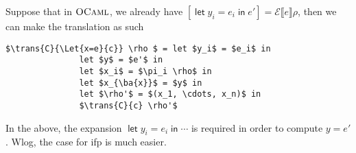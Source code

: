 \documentclass[11pt,a4paper]{article}
\newcommand {\coo} [1] {\ensuremath{\operatorname{\mathsf{#1}}}}
\newcommand{\Let}[1]{\coo{let} #1 \coo{in} }
\newcommand{\ba}[1]{\left\langle #1\right\rangle}
\newcommand{\f}[1]{\textsc{#1}}
\newcommand{\g}[1]{\textsf{#1}}
\newcommand{\trans}[2]{\ensuremath{\mathcal{#1}\llbracket #2\rrbracket}}
\begin{document}
Suppose that in $\f{OCaml}$, we already have $[\Let{y_i = e_i}{e'}] = \trans{E}{e}\rho$, then we can make the translation as such
\begin{lstlisting}
$\trans{C}{\Let{x=e}{c}} \rho $ = let $y_i$ = $e_i$ in
               let $y$ = $e'$ in
               let $x_i$ = $\pi_i \rho$ in
               let $x_{\ba{x}}$ = $y$ in
               let $\rho'$ = $(x_1, \cdots, x_n)$ in
               $\trans{C}{c} \rho'$
\end{lstlisting}
In the above, the expansion $\Let{y_i = e_i}{\cdots}$ is required in order to compute $y = e'$. Wlog, the case for \g{ifp} is much easier.
\end{document}
